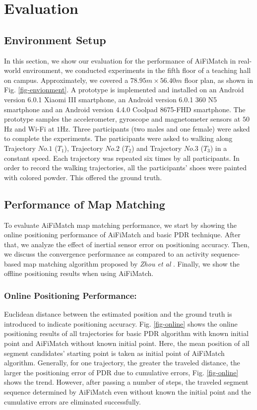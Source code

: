 \documentclass{llncs}
\begin{document}
\section{Evaluation}

\subsection{Environment Setup}

In this section, we show our evaluation for the performance of AiFiMatch in real-world environment, we conducted experiments in the fifth floor of a teaching hall on campus. Approximately, we covered a $78.95m \times 56.40m$ floor plan, as shown in Fig. \ref{fig-envionment}. A prototype is implemented and installed on an Android version 6.0.1 Xiaomi III smartphone, an Android version 6.0.1 360 N5 smartphone and an Android version 4.4.0 Coolpad 8675-FHD smartphone. The prototype samples the accelerometer, gyroscope and magnetometer sensors at $50$Hz and Wi-Fi at $1$Hz. Three participants (two males and one female) were asked to complete the experiments. The participants were asked to walking along Trajectory $No.1$ ($T_1$), Trajectory $No.2$ ($T_2$) and Trajectory $No.3$ ($T_3$) in a constant speed. Each trajectory was repeated six times by all participants. In order to record the walking trajectories, all the participants' shoes were painted with colored powder. This offered the ground truth.

\subsection{Performance of Map Matching}

To evaluate AiFiMatch map matching performance, we start by showing the online positioning performance of AiFiMatch and basic PDR technique. After that, we analyze the effect of inertial sensor error on positioning accuracy. Then, we discuss the convergence performance as compared to an activity sequence-based map matching algorithm proposed by \emph{Zhou et al} \cite{zhou2015activity}. Finally, we show the offline positioning results when using AiFiMatch.

\subsubsection{Online Positioning Performance:}

Euclidean distance between the estimated position and the ground truth is introduced to indicate positioning accuracy.  Fig. \ref{fig-online} shows the online positioning results of all trajectories for basic PDR algorithm with known initial point and AiFiMatch without known initial point.  Here, the mean position of all segment candidates' starting point is taken as initial point of AiFiMatch algorithm. Generally, for one trajectory, the greater the traveled distance, the larger the positioning error of PDR due to cumulative errors, Fig. \ref{fig-online} shows the trend.  However, after passing a number of steps, the traveled segment sequence determined by AiFiMatch even without known the initial point and the cumulative  errors are eliminated successfully.
\end{document}
